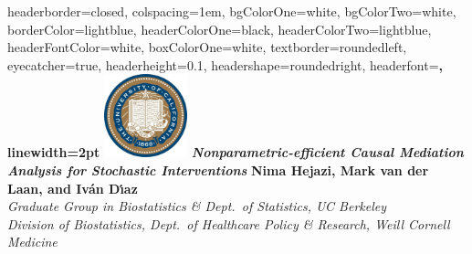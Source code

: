 \documentclass[landscape,a0paper,fontscale=0.285]{baposter} %
\begin{document}
\begin{poster} {
headerborder=closed, %
colspacing=1em, %
bgColorOne=white, %
bgColorTwo=white, %
borderColor=lightblue, %
headerColorOne=black, %
headerColorTwo=lightblue, %
headerFontColor=white, %
boxColorOne=white, %
textborder=roundedleft, %
eyecatcher=true, %
headerheight=0.1\textheight, %
headershape=roundedright, %
headerfont=\Large\bf\textsc, %
linewidth=2pt %
}
%
{\includegraphics[height=6.5em]{logo_berkeley.jpg}} %
{\bf\textit{\LARGE Nonparametric-efficient Causal Mediation Analysis for
    Stochastic Interventions}\vspace{0.01em}} %
{\textbf{Nima Hejazi, Mark van der Laan, and Iv{\'a}n D{\'\i}az} \\
  \textit{Graduate Group in Biostatistics \& Dept.~of Statistics, UC Berkeley}\\
  \textit{Division of Biostatistics, Dept.~of Healthcare Policy \& Research,
          Weill Cornell Medicine}}


\end{poster}
\end{document}
